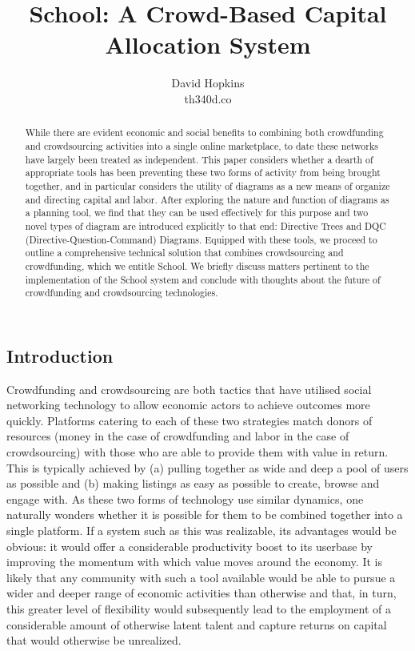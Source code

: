 \documentclass{article}
\title{School: A Crowd-Based Capital Allocation System}
\author{David Hopkins \\ th340d.co}
\date{}
\begin{document}
\maketitle

\begin{multicols}{2}



\begin{abstract}
While there are evident economic and social benefits to combining both crowdfunding and crowdsourcing activities into a single online marketplace, to date these networks have largely been treated as independent. This paper considers whether a dearth of appropriate tools has been preventing these two forms of activity from being brought together, and in particular considers the utility of diagrams as a new means of organize and directing capital and labor. After exploring the nature and function of diagrams as a planning tool, we find that they can be used effectively for this purpose and two novel types of diagram are introduced explicitly to that end: Directive Trees and DQC (Directive-Question-Command) Diagrams. Equipped with these tools, we proceed to outline a comprehensive technical solution that combines crowdsourcing and crowdfunding, which we entitle School. We briefly discuss matters pertinent to the implementation of the School system and conclude with thoughts about the future of crowdfunding and crowdsourcing technologies.

\end{abstract}

\section{Introduction}

Crowdfunding and crowdsourcing are both tactics that have utilised social networking technology to allow economic actors to achieve outcomes more quickly. Platforms catering to each of these two strategies match donors of resources (money in the case of crowdfunding and labor in the case of crowdsourcing) with those who are able to provide them with value in return. This is typically achieved by (a) pulling together as wide and deep a pool of users as possible and (b) making listings as easy as possible to create, browse and engage with. As these two forms of technology use similar dynamics, one naturally wonders whether it is possible for them to be combined together into a single platform. If a system such as this was realizable, its advantages would be obvious: it would offer a considerable productivity boost to its userbase by improving the momentum with which value moves around the economy. It is likely that any community with such a tool available would be able to pursue a wider and deeper range of economic activities than otherwise and that, in turn, this greater level of flexibility would subsequently lead to the employment of a considerable amount of otherwise latent talent and capture returns on capital that would otherwise be unrealized.


\end{multicols}
\end{document}
